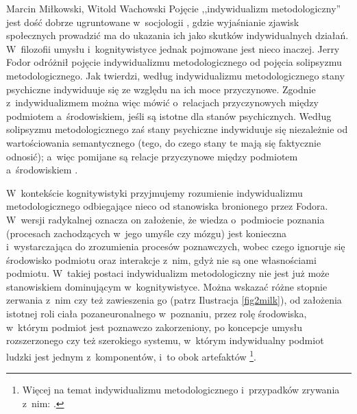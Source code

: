 \begin{artplenv2auth}{Marcin Miłkowski, Witold Wachowski}
Pojęcie ,,indywidualizm metodologiczny'' jest dość dobrze ugruntowane w~socjologii
\parencites[np.][]{schumpeter_wesen_1908}[][]{weber_gospodarka_2002}, %
 gdzie wyjaśnianie zjawisk społecznych prowadzić ma do ukazania ich jako skutków indywidualnych działań. W~filozofii umysłu i~kognitywistyce jednak pojmowane jest nieco inaczej. Jerry Fodor odróżnił pojęcie indywidualizmu metodologicznego od pojęcia solipsyzmu metodologicznego. Jak twierdzi, według indywidualizmu metodologicznego stany psychiczne indywiduuje się ze względu na ich moce przyczynowe. Zgodnie z~indywidualizmem można więc mówić o~relacjach przyczynowych między podmiotem a~środowiskiem, jeśli są istotne dla stanów psychicznych. Według solipsyzmu metodologicznego zaś stany psychiczne indywiduuje się niezależnie od wartościowania semantycznego (tego, do czego stany te mają się faktycznie odnosić); a~więc pomijane są relacje przyczynowe między podmiotem a~środowiskiem 
\parencites[][]{fodor_methodological_1980}[por. też][]{heath_methodological_2020}.%



W~kontekście kognitywistyki przyjmujemy rozumienie indywidualizmu metodologicznego odbiegające nieco od stanowiska bronionego przez Fodora. W~wersji radykalnej oznacza on założenie, że wiedza o~podmiocie poznania (procesach zachodzących w~jego umyśle czy mózgu) jest konieczna i~wystarczająca do zrozumienia procesów poznawczych, wobec czego ignoruje się środowisko podmiotu oraz interakcje z~nim, gdyż nie są one własnościami podmiotu. W~takiej postaci indywidualizm metodologiczny nie jest już może stanowiskiem dominującym w~kognitywistyce. Można wskazać różne stopnie zerwania z~nim czy też zawieszenia go (patrz Ilustracja \ref{fig2milk}), od założenia istotnej roli ciała pozaneuronalnego w~poznaniu, przez rolę środowiska, w~którym podmiot jest poznawczo zakorzeniony, po koncepcje umysłu rozszerzonego czy też szerokiego systemu, w~którym indywidualny podmiot ludzki jest jednym z~komponentów, i~to obok artefaktów%
\footnote{Więcej na temat indywidualizmu metodologicznego i~przypadków zrywania z~nim: \parencite[][]{wachowski_poznanie_2022}.}.



\end{artplenv2auth}
